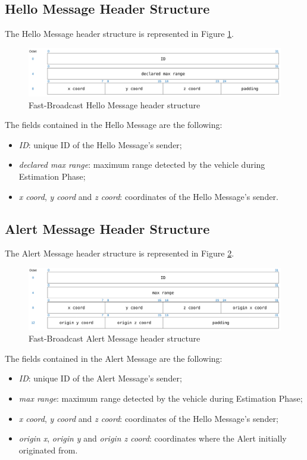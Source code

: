 		\subsection{Hello Message Header Structure}
			The Hello Message header structure is represented in Figure \ref{fig:fbHelloHeader}.
			\begin{figure}[H]
				\centering
				\includegraphics[width=\textwidth]{immagini/fbHelloHeader}
				\caption{Fast-Broadcast Hello Message header structure}
				\label{fig:fbHelloHeader}
			\end{figure}
			
			The fields contained in the Hello Message are the following:
			\begin{itemize}
				\item \textit{ID}: unique ID of the Hello Message's sender;
				\item \textit{declared max range}: maximum range detected by the vehicle during Estimation Phase;
				\item \textit{x coord}, \textit{y coord} and \textit{z coord}: coordinates of the Hello Message's sender.
			\end{itemize}
		
		\subsection{Alert Message Header Structure}
			The Alert Message header structure is represented in Figure \ref{fig:fbAlertHeader}.
			\begin{figure}[H]
				\centering
				\includegraphics[width=\textwidth]{immagini/fbAlertHeader}
				\caption{Fast-Broadcast Alert Message header structure}
				\label{fig:fbAlertHeader}
			\end{figure}
		
		The fields contained in the Alert Message are the following:
		\begin{itemize}
			\item \textit{ID}: unique ID of the Alert Message's sender;
			\item \textit{max range}: maximum range detected by the vehicle during Estimation Phase;
			\item \textit{x coord}, \textit{y coord} and \textit{z coord}: coordinates of the Hello Message's sender;
			\item \textit{origin x}, \textit{origin y} and \textit{origin z coord}: coordinates where the Alert initially originated from.
		\end{itemize}
	

